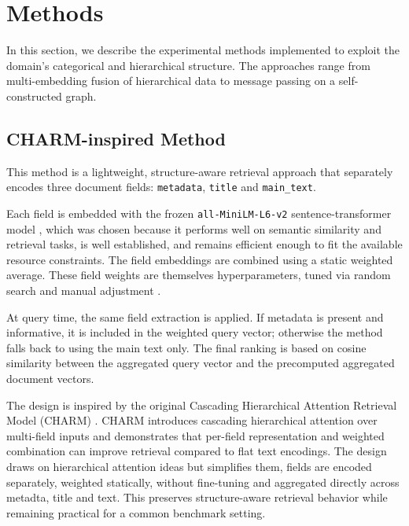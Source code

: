 \documentclass[11pt]{article}
\begin{document}
\section{Methods}
\label{sec:methods}
In this section, we describe the experimental methods implemented to exploit the domain’s categorical and hierarchical structure. The approaches range from multi-embedding fusion of hierarchical data to message passing on a self-constructed graph.

\subsection{CHARM-inspired Method}
\label{subsec:CHARM}

This method is a lightweight, structure-aware retrieval approach that separately encodes three document fields: \texttt{metadata}, \texttt{title} and \texttt{main\_text}.

Each field is embedded with the frozen \texttt{all-MiniLM-L6-v2} sentence-transformer model \cite{reimers-2019-sentence-bert}, which was chosen because it performs well on semantic similarity and retrieval tasks, is well established, and remains efficient enough to fit the available resource constraints. The field embeddings are combined using a static weighted average. These field weights are themselves hyperparameters, tuned via random search and manual adjustment \cite{bergstra_random_2012}.


At query time, the same field extraction is applied. If metadata is present and informative, it is included in the weighted query vector; otherwise the method falls back to using the main text only. The final ranking is based on cosine similarity between the aggregated query vector and the precomputed aggregated document vectors.

The design is inspired by the original Cascading Hierarchical Attention Retrieval Model (CHARM) \cite{freymuth_hierarchical_2025}.
CHARM introduces cascading hierarchical attention over multi-field inputs and demonstrates that per-field representation and weighted combination can improve retrieval compared to flat text encodings. The design draws on hierarchical attention ideas but simplifies them, fields are encoded separately, weighted statically, without fine-tuning and aggregated directly across metadta, title and text. This preserves structure-aware retrieval behavior while remaining practical for a common benchmark setting.
\end{document}
